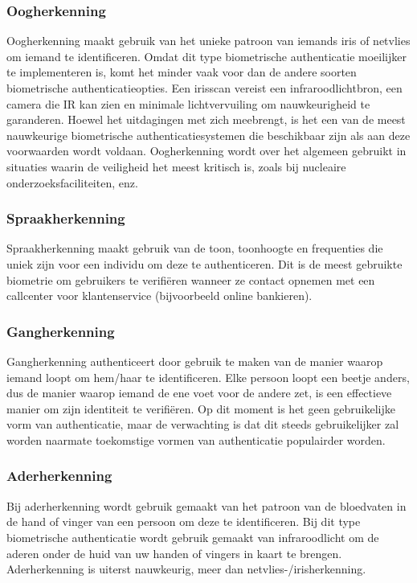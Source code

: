   \subsubsection{Oogherkenning}%
  \label{subsubsec:oogherkenning}
  Oogherkenning maakt gebruik van het unieke patroon van iemands iris of netvlies om iemand te identificeren. Omdat dit type biometrische authenticatie moeilijker te implementeren is, komt het minder vaak voor dan de andere soorten biometrische authenticatieopties. Een irisscan vereist een infraroodlichtbron, een camera die IR kan zien en minimale lichtvervuiling om nauwkeurigheid te garanderen. Hoewel het uitdagingen met zich meebrengt, is het een van de meest nauwkeurige biometrische authenticatiesystemen die beschikbaar zijn als aan deze voorwaarden wordt voldaan. Oogherkenning wordt over het algemeen gebruikt in situaties waarin de veiligheid het meest kritisch is, zoals bij nucleaire onderzoeksfaciliteiten, enz.
  
  \subsubsection{Spraakherkenning}%
  \label{subsubsec:spraakherkenning}
  Spraakherkenning maakt gebruik van de toon, toonhoogte en frequenties die uniek zijn voor een individu om deze te authenticeren. Dit is de meest gebruikte biometrie om gebruikers te verifiëren wanneer ze contact opnemen met een callcenter voor klantenservice (bijvoorbeeld online bankieren).
  
  \subsubsection{Gangherkenning}%
  \label{subsubsec:gangherkenning}
  Gangherkenning authenticeert door gebruik te maken van de manier waarop iemand loopt om hem/haar te identificeren. Elke persoon loopt een beetje anders, dus de manier waarop iemand de ene voet voor de andere zet, is een effectieve manier om zijn identiteit te verifiëren. Op dit moment is het geen gebruikelijke vorm van authenticatie, maar de verwachting is dat dit steeds gebruikelijker zal worden naarmate toekomstige vormen van authenticatie populairder worden.
  
  \subsubsection{Aderherkenning}%
  \label{subsubsec:aderherkenning}
  Bij aderherkenning wordt gebruik gemaakt van het patroon van de bloedvaten in de hand of vinger van een persoon om deze te identificeren. Bij dit type biometrische authenticatie wordt gebruik gemaakt van infraroodlicht om de aderen onder de huid van uw handen of vingers in kaart te brengen. Aderherkenning is uiterst nauwkeurig, meer dan netvlies-/irisherkenning.
  
